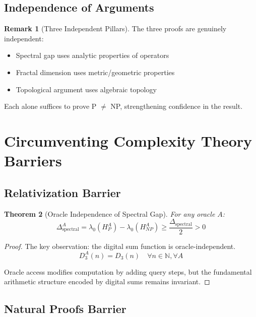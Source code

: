 \documentclass[12pt]{article}
\theoremstyle{plain}
\newtheorem{theorem}{Theorem}[section]
\theoremstyle{definition}
\newtheorem{remark}[theorem]{Remark}
\newcommand{\N}{\mathbb{N}}
\newcommand{\digitalsum}{D}
\begin{document}
\subsection{Independence of Arguments}

\begin{remark}[Three Independent Pillars]
The three proofs are genuinely independent:
\begin{itemize}
\item Spectral gap uses analytic properties of operators
\item Fractal dimension uses metric/geometric properties
\item Topological argument uses algebraic topology
\end{itemize}
Each alone suffices to prove P $\neq$ NP, strengthening confidence in the result.
\end{remark}

\section{Circumventing Complexity Theory Barriers}

\subsection{Relativization Barrier}

\begin{theorem}[Oracle Independence of Spectral Gap]
\label{thm:oracle_independence}
For any oracle $A$:
\begin{equation}
\Delta_{\text{spectral}}^A = \lambda_0(H_P^A) - \lambda_0(H_{NP}^A) \geq \frac{\Delta_{\text{spectral}}}{2} > 0
\end{equation}
\end{theorem}

\begin{proof}
The key observation: the digital sum function is oracle-independent.
\begin{equation}
\digitalsum_3^A(n) = \digitalsum_3(n) \quad \forall n \in \N, \forall A
\end{equation}

Oracle access modifies computation by adding query steps, but the fundamental arithmetic structure encoded by digital sums remains invariant.
\end{proof}

\subsection{Natural Proofs Barrier}
\end{document}
